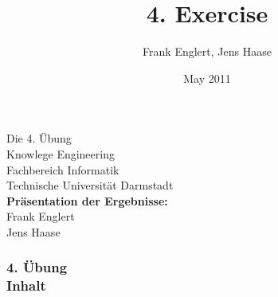 \documentclass[accentcolor=tud1b,colorbacktitle,inverttitle,landscape,presentation,t]{tudbeamer}
\newcommand{\myframetitle}[2]{\frametitle{#1 \\[.2cm] \small #2}}
\begin{document}
\title[MGA]{\large 4. Exercise}

\author{Frank Englert, Jens Haase}


\date{May 2011}

\begin{titleframe}
\begin{center}
\color{tudtextaccent} \large Die 4. Übung\\[.5cm]
\normalcolor \normalsize Knowlege Engineering \\
Fachbereich Informatik \\
Technische Universität Darmstadt\\[.5cm]

\textbf{Präsentation der Ergebnisse:}\\
Frank Englert\\ 
Jens Haase
\end{center}

\end{titleframe} 

\begin{frame}[c]
	\myframetitle{4. Übung}{Inhalt}

\end{frame}





\end{document}
